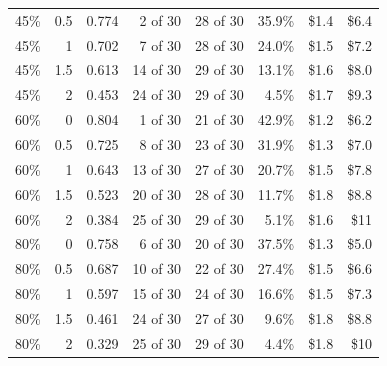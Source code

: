 \begin{tabular}{rrrrrrrr}
45\% & 0.5 & 0.774 & 2 of 30 & 28 of 30 & 35.9\% & \$1.4 & \$6.4 \\
45\% & 1 & 0.702 & 7 of 30 & 28 of 30 & 24.0\% & \$1.5 & \$7.2 \\
45\% & 1.5 & 0.613 & 14 of 30 & 29 of 30 & 13.1\% & \$1.6 & \$8.0 \\
45\% & 2 & 0.453 & 24 of 30 & 29 of 30 & 4.5\% & \$1.7 & \$9.3 \\
60\% & 0 & 0.804 & 1 of 30 & 21 of 30 & 42.9\% & \$1.2 & \$6.2 \\
60\% & 0.5 & 0.725 & 8 of 30 & 23 of 30 & 31.9\% & \$1.3 & \$7.0 \\
60\% & 1 & 0.643 & 13 of 30 & 27 of 30 & 20.7\% & \$1.5 & \$7.8 \\
60\% & 1.5 & 0.523 & 20 of 30 & 28 of 30 & 11.7\% & \$1.8 & \$8.8 \\
60\% & 2 & 0.384 & 25 of 30 & 29 of 30 & 5.1\% & \$1.6 & \$11 \\
80\% & 0 & 0.758 & 6 of 30 & 20 of 30 & 37.5\% & \$1.3 & \$5.0 \\
80\% & 0.5 & 0.687 & 10 of 30 & 22 of 30 & 27.4\% & \$1.5 & \$6.6 \\
80\% & 1 & 0.597 & 15 of 30 & 24 of 30 & 16.6\% & \$1.5 & \$7.3 \\
80\% & 1.5 & 0.461 & 24 of 30 & 27 of 30 & 9.6\% & \$1.8 & \$8.8 \\
80\% & 2 & 0.329 & 25 of 30 & 29 of 30 & 4.4\% & \$1.8 & \$10 \\
\bottomrule
\end{tabular}
